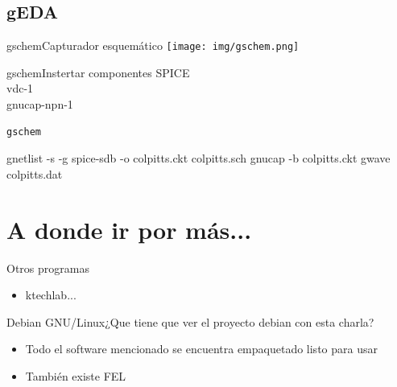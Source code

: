 \documentclass{beamer}
\begin{document}
\subsection{gEDA}

\begin{frame}{gschem}{Capturador esquemático}
  \texttt{[image: img/gschem.png]}
\end{frame}


\begin{frame}{gschem}{Instertar componentes}
  SPICE\\
  vdc-1\\
  gnucap-npn-1\\
\end{frame}

\begin{frame}[fragile]
  \begin{block}{}
\begin{verbatim}
gschem
\end{verbatim}
  \end{block}
\end{frame}

\begin{frame}
  gnetlist -s -g spice-sdb -o colpitts.ckt colpitts.sch
  gnucap -b colpitts.ckt
  gwave colpitts.dat
\end{frame}

\section{A donde ir por más...}

\begin{frame}{Otros programas}
  \begin{itemize}
  \item ktechlab...
  \end{itemize}
\end{frame}

\begin{frame}{Debian GNU/Linux}{¿Que tiene que ver el proyecto debian con esta charla?}
  \begin{itemize}
  \item Todo el software mencionado se encuentra empaquetado listo para usar
  \item También existe FEL
  \end{itemize}
\end{frame}
\end{document}
